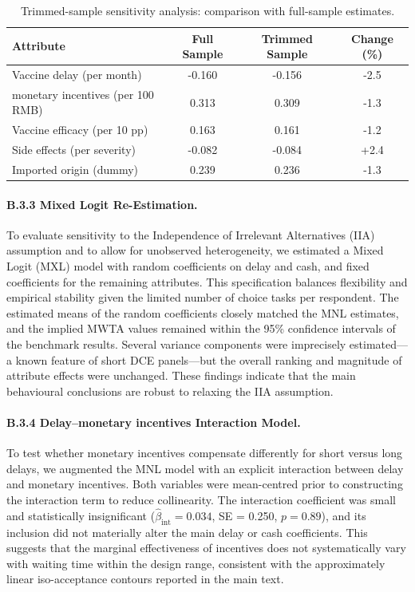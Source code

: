 \documentclass[12pt]{article}
\begin{document}
\begin{table}[H]
\centering
\caption{Trimmed-sample sensitivity analysis: comparison with full-sample estimates.}
\label{tab:trimmed}
\begin{tabular}{lccc}
\toprule
Attribute & Full Sample & Trimmed Sample & Change (\%) \\
\midrule
Vaccine delay (per month)       & -0.160 & -0.156 & -2.5 \\
monetary incentives (per 100 RMB)    &  0.313 &  0.309 & -1.3 \\
Vaccine efficacy (per 10 pp)    &  0.163 &  0.161 & -1.2 \\
Side effects (per severity)     & -0.082 & -0.084 & +2.4 \\
Imported origin (dummy)         &  0.239 &  0.236 & -1.3 \\
\bottomrule
\end{tabular}
\end{table}

\paragraph{B.3.3 Mixed Logit Re-Estimation.}
To evaluate sensitivity to the Independence of Irrelevant Alternatives (IIA) assumption and to 
allow for unobserved heterogeneity, we estimated a Mixed Logit (MXL) model with random 
coefficients on delay and cash, and fixed coefficients for the remaining attributes. This 
specification balances flexibility and empirical stability given the limited number of choice 
tasks per respondent. The estimated means of the random coefficients closely matched the MNL 
estimates, and the implied MWTA values remained within the 95\% confidence intervals of the 
benchmark results. Several variance components were imprecisely estimated—a known feature of 
short DCE panels—but the overall ranking and magnitude of attribute effects were unchanged. 
These findings indicate that the main behavioural conclusions are robust to relaxing the IIA 
assumption.

\paragraph{B.3.4 Delay--monetary incentives Interaction Model.}
To test whether monetary incentives compensate differently for short versus long delays, we 
augmented the MNL model with an explicit interaction between delay and monetary incentives. Both 
variables were mean-centred prior to constructing the interaction term to reduce collinearity. 
The interaction coefficient was small and statistically insignificant ($\hat{\beta}_{\text{int}} 
= 0.034$, SE = 0.250, $p = 0.89$), and its inclusion did not materially alter the main delay 
or cash coefficients. This suggests that the marginal effectiveness of incentives does not 
systematically vary with waiting time within the design range, consistent with the 
approximately linear iso-acceptance contours reported in the main text.
\end{document}
